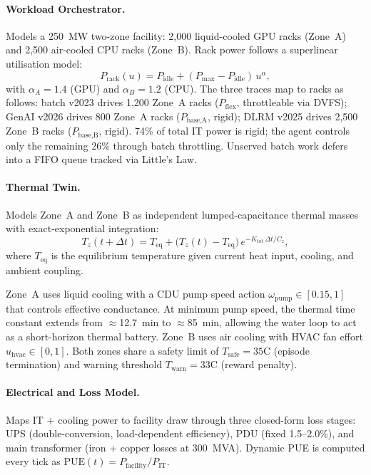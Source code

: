 \documentclass{article}
\begin{document}
\paragraph{Workload Orchestrator.}
Models a 250~MW two-zone facility: 2,000 liquid-cooled GPU racks (Zone~A)
and 2,500 air-cooled CPU racks (Zone~B).
Rack power follows a superlinear utilisation model:
\begin{equation}
  P_{\text{rack}}(u) = P_{\text{idle}} + (P_{\max} - P_{\text{idle}})\,u^{\alpha},
  \label{eq:rack}
\end{equation}
with $\alpha_A = 1.4$ (GPU) and $\alpha_B = 1.2$ (CPU).
The three traces map to racks as follows:
batch v2023 drives 1,200 Zone~A racks ($P_{\text{flex}}$, throttleable via DVFS);
GenAI v2026 drives 800 Zone~A racks ($P_{\text{base,A}}$, rigid);
DLRM v2025 drives 2,500 Zone~B racks ($P_{\text{base,B}}$, rigid).
74\% of total IT power is rigid; the agent controls only the remaining 26\%
through batch throttling.
Unserved batch work defers into a FIFO queue tracked via Little's Law.

\paragraph{Thermal Twin.}
Models Zone~A and Zone~B as independent lumped-capacitance thermal masses
with exact-exponential integration:
\begin{equation}
  T_z(t{+}\Delta t) = T_{\text{eq}} + \bigl(T_z(t) - T_{\text{eq}}\bigr)\,
  e^{-K_{\text{tot}}\,\Delta t / C_z},
  \label{eq:thermal}
\end{equation}
where $T_{\text{eq}}$ is the equilibrium temperature given current heat input,
cooling, and ambient coupling.

Zone~A uses liquid cooling with a CDU pump speed action
$\omega_{\text{pump}} \in [0.15, 1]$ that controls effective conductance.
At minimum pump speed, the thermal time constant extends from $\approx$12.7~min
to $\approx$85~min, allowing the water loop to act as a short-horizon thermal
battery.
Zone~B uses air cooling with HVAC fan effort $u_{\text{hvac}} \in [0, 1]$.
Both zones share a safety limit of $T_{\text{safe}} = 35$\textdegree C (episode
termination) and warning threshold $T_{\text{warn}} = 33$\textdegree C (reward
penalty).

\paragraph{Electrical and Loss Model.}
Maps IT + cooling power to facility draw through three closed-form loss stages:
UPS (double-conversion, load-dependent efficiency), PDU (fixed 1.5--2.0\%),
and main transformer (iron + copper losses at 300~MVA).
Dynamic PUE is computed every tick as $\text{PUE}(t) = P_{\text{facility}} / P_{\text{IT}}$.
\end{document}
